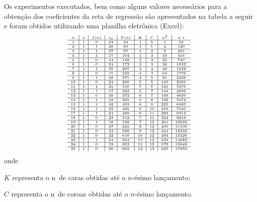 \begin{exercise}
\begin{description}
{Os experimentos executados, bem como alguns valores necessários para a obtenção dos coeficientes da reta de regressão são apresentados na tabela a seguir e foram obtidos utilizando uma planilha eletrônica (Excel):
\[\tiny
\begin{array}{c|c|c|c|c|c|c|c|c}
n & 1 & f(n) & t_n & T(n) & K & C & n^2 & n\ t \\ \hline
1 & 1 & 0 & 24 & 24 & 1 & 0 & 1 & 24 \\ \hline
2 & 1 & 1 & 36 & 60 & 1 & 1 & 4 & 120 \\ \hline
3 & 1 & 1 & 27 & 87 & 1 & 2 & 9 & 261 \\ \hline
4 & 1 & 1 & 17 & 104 & 1 & 3 & 16 & 416 \\ \hline
5 & 1 & 0 & 44 & 148 & 2 & 3 & 25 & 740 \\ \hline
6 & 1 & 0 & 24 & 172 & 3 & 3 & 36 & 1032 \\ \hline
7 & 1 & 1 & 35 & 207 & 3 & 4 & 49 & 1449 \\ \hline
8 & 1 & 0 & 15 & 222 & 4 & 4 & 64 & 1776 \\ \hline
9 & 1 & 1 & 49 & 271 & 4 & 5 & 81 & 2439 \\ \hline
10 & 1 & 0 & 24 & 295 & 5 & 5 & 100 & 2950 \\ \hline
11 & 1 & 1 & 21 & 316 & 5 & 6 & 121 & 3476 \\ \hline
12 & 1 & 1 & 17 & 333 & 5 & 7 & 144 & 3996 \\ \hline
13 & 1 & 0 & 39 & 372 & 6 & 7 & 169 & 4836 \\ \hline
14 & 1 & 1 & 19 & 391 & 6 & 8 & 196 & 5474 \\ \hline
15 & 1 & 1 & 42 & 433 & 6 & 9 & 225 & 6495 \\ \hline
16 & 1 & 1 & 32 & 465 & 6 & 10 & 256 & 7440 \\ \hline
17 & 1 & 1 & 24 & 489 & 6 & 11 & 289 & 8313 \\ \hline
18 & 1 & 0 & 23 & 512 & 7 & 11 & 324 & 9216 \\ \hline
19 & 1 & 1 & 16 & 528 & 7 & 12 & 361 & 10032 \\ \hline
20 & 1 & 0 & 27 & 555 & 8 & 12 & 400 & 11100 \\ \hline
21 & 1 & 0 & 33 & 588 & 9 & 12 & 441 & 12348 \\ \hline
22 & 1 & 0 & 22 & 610 & 10 & 12 & 484 & 13420 \\ \hline
23 & 1 & 1 & 24 & 634 & 10 & 13 & 529 & 14582 \\ \hline
24 & 1 & 0 & 18 & 652 & 11 & 13 & 576 & 15648 \\ \hline
25 & 1 & 0 & 30 & 682 & 12 & 13 & 625 & 17050
\end{array}
\]
onde
\begin{description}
\item \(K\) representa o n\textordmasculine\ de caras obtidas até o \(n\)-ésimo lançamento;
\item \(C\) representa o n\textordmasculine\ de coroas obtidas até o \(n\)-ésimo lançamento.
\end{description}

}
\end{description}
\end{exercise}
